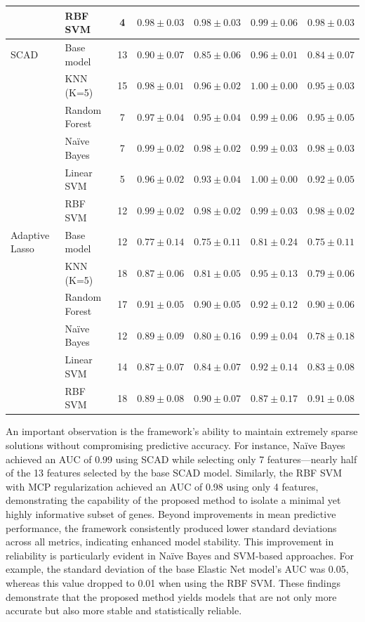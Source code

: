 \documentclass[twoside]{article}
\begin{document}
\begin{table}[h!]
\begin{tabular}{|l|l|ccccc|}
		& RBF SVM      & 4  & $0.98 \pm 0.03$ & $0.98 \pm 0.03$ & $0.99 \pm 0.06$ & $0.98 \pm 0.03$ \\
		\hline
		{SCAD}
		& Base model   & 13 & $0.90 \pm 0.07$ & $0.85 \pm 0.06$ & $0.96 \pm 0.01$ & $0.84 \pm 0.07$ \\
		& KNN (K=5)    & 15 & $0.98 \pm 0.01$ & $0.96 \pm 0.02$ & $1.00 \pm 0.00$ & $0.95 \pm 0.03$ \\
		& Random Forest& 7  & $0.97 \pm 0.04$ & $0.95 \pm 0.04$ & $0.99 \pm 0.06$ & $0.95 \pm 0.05$ \\
		& Naïve Bayes  & 7  & $0.99 \pm 0.02$ & $0.98 \pm 0.02$ & $0.99 \pm 0.03$ & $0.98 \pm 0.03$ \\
		& Linear SVM   & 5  & $0.96 \pm 0.02$ & $0.93 \pm 0.04$ & $1.00 \pm 0.00$ & $0.92 \pm 0.05$ \\
		& RBF SVM      & 12 & $0.99 \pm 0.02$ & $0.98 \pm 0.02$ & $0.99 \pm 0.03$ & $0.98 \pm 0.02$ \\
		\hline
		{Adaptive Lasso}
		& Base model   & 12 & $0.77 \pm 0.14$ & $0.75 \pm 0.11$ & $0.81 \pm 0.24$ & $0.75 \pm 0.11$ \\
		& KNN (K=5)    & 18 & $0.87 \pm 0.06$ & $0.81 \pm 0.05$ & $0.95 \pm 0.13$ & $0.79 \pm 0.06$ \\
		& Random Forest& 17 & $0.91 \pm 0.05$ & $0.90 \pm 0.05$ & $0.92 \pm 0.12$ & $0.90 \pm 0.06$ \\
		& Naïve Bayes  & 12 & $0.89 \pm 0.09$ & $0.80 \pm 0.16$ & $0.99 \pm 0.04$ & $0.78 \pm 0.18$ \\
		& Linear SVM   & 14 & $0.87 \pm 0.07$ & $0.84 \pm 0.07$ & $0.92 \pm 0.14$ & $0.83 \pm 0.08$ \\
		& RBF SVM      & 18 & $0.89 \pm 0.08$ & $0.90 \pm 0.07$ & $0.87 \pm 0.17$ & $0.91 \pm 0.08$ \\
		\hline
	\end{tabular}
\end{table}

An important observation is the framework’s ability to maintain extremely sparse solutions without compromising predictive accuracy. For instance, Na\"ive Bayes achieved an AUC of 0.99 using SCAD while selecting only 7 features—nearly half of the 13 features selected by the base SCAD model. Similarly, the RBF SVM with MCP regularization achieved an AUC of 0.98 using only 4 features, demonstrating the capability of the proposed method to isolate a minimal yet highly informative subset of genes. Beyond improvements in mean predictive performance, the framework consistently produced lower standard deviations across all metrics, indicating enhanced model stability. This improvement in reliability is particularly evident in Na\"ive Bayes and SVM-based approaches. For example, the standard deviation of the base Elastic Net model’s AUC was 0.05, whereas this value dropped to 0.01 when using the RBF SVM. These findings demonstrate that the proposed method yields models that are not only more accurate but also more stable and statistically reliable.
\end{document}
